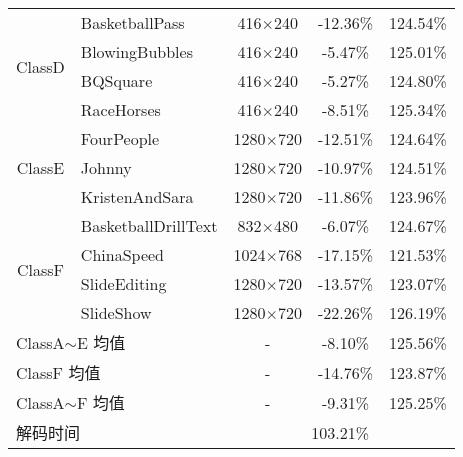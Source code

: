 \begin{table}[htbp]
\begin{tabular}{@{}clccc@{}}
        \multirow{4}{*}{ClassD}                & BasketballPass               & 416$\times$240   & -12.36\% & 124.54\% \\
                                               & BlowingBubbles               & 416$\times$240   & -5.47\%  & 125.01\% \\
                                               & BQSquare                     & 416$\times$240   & -5.27\%  & 124.80\% \\
                                               & RaceHorses                   & 416$\times$240   & -8.51\%  & 125.34\% \\
        \multirow{3}{*}{ClassE}                & FourPeople                   & 1280$\times$720  & -12.51\% & 124.64\% \\
                                               & Johnny                       & 1280$\times$720  & -10.97\% & 124.51\% \\
                                               & KristenAndSara               & 1280$\times$720  & -11.86\% & 123.96\% \\
        \multirow{4}{*}{ClassF}                & BasketballDrillText          & 832$\times$480   & -6.07\%  & 124.67\% \\
                                               & ChinaSpeed                   & 1024$\times$768  & -17.15\% & 121.53\% \\
                                               & SlideEditing                 & 1280$\times$720  & -13.57\% & 123.07\% \\
                                               & SlideShow                    & 1280$\times$720  & -22.26\% & 126.19\% \\ \midrule
        \multicolumn{2}{l}{ClassA$\sim$E 均值} & -                            & -8.10\%          & 125.56\%            \\ \midrule
        \multicolumn{2}{l}{ClassF 均值}        & -                            & -14.76\%         & 123.87\%            \\ \midrule
        \multicolumn{2}{l}{ClassA$\sim$F 均值} & -                            & -9.31\%          & 125.25\%            \\ \midrule
        \multicolumn{2}{l}{解码时间}           & \multicolumn{3}{c}{103.21\%}                                          \\ \bottomrule
    \end{tabular}
\end{table}

